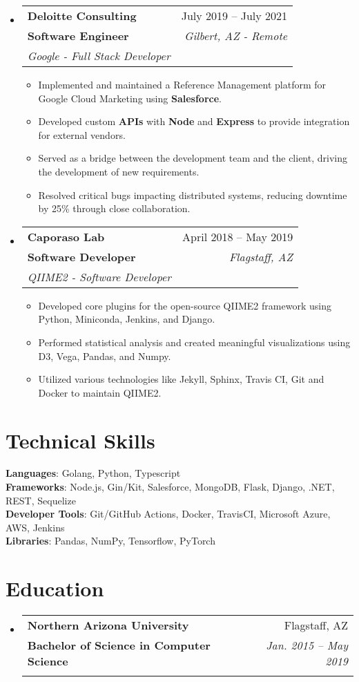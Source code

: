 \documentclass[letterpaper,11pt]{article}
\makeatletter
\newcommand{\resumeItem}[1]{
  \item\small{
    {#1 \vspace{-2pt}}
  }
}
\newcommand{\resumeSubheading}[5]{
  \vspace{-2pt}\item
    \begin{tabular*}{0.97\textwidth}[t]{l@{\extracolsep{\fill}}r}
      \textbf{#1} & #2 \\
      \textbf{\small#3} & \textit{\small #4} \\
      \textit{\small#5} \\
    \end{tabular*}\vspace{-7pt}
}
\newcommand{\resumeSubHeadingListStart}{\begin{itemize}[leftmargin=0.15in, label={}]}
\newcommand{\resumeSubHeadingListEnd}{\end{itemize}}
\newcommand{\resumeItemListStart}{\begin{itemize}}
\newcommand{\resumeItemListEnd}{\end{itemize}\vspace{-5pt}}
\makeatother
\begin{document}
\resumeSubHeadingListStart
\resumeSubheading
{Deloitte Consulting}{July 2019 -- July 2021}
{Software Engineer}{Gilbert, AZ - Remote}
{Google - Full Stack Developer}
\resumeItemListStart
\resumeItem{Implemented and maintained a Reference Management platform for Google Cloud Marketing using \textbf{Salesforce}.}
\resumeItem{Developed custom \textbf{APIs} with \textbf{Node} and \textbf{Express} to provide integration for external vendors.}
\resumeItem{Served as a bridge between the development team and the client, driving the development of new requirements.}
\resumeItem{Resolved critical bugs impacting distributed systems, reducing downtime by 25\% through close collaboration.}
\resumeItemListEnd
\resumeSubHeadingListEnd



\resumeSubHeadingListStart
\resumeSubheading
{Caporaso Lab}{April 2018 -- May 2019}
{Software Developer}{Flagstaff, AZ}
{QIIME2 - Software Developer}
\resumeItemListStart
\resumeItem{Developed core plugins for the open-source QIIME2 framework using Python, Miniconda, Jenkins, and Django.}
\resumeItem{Performed statistical analysis and created meaningful visualizations using D3, Vega, Pandas, and Numpy.}
\resumeItem{Utilized various technologies like Jekyll, Sphinx, Travis CI, Git and Docker to maintain QIIME2.}
\resumeItemListEnd
\resumeSubHeadingListEnd


\section{Technical Skills}
\begin{itemize}[leftmargin=0.15in, label={}]
 \small{\item{
       \textbf{Languages}{: Golang, Python, Typescript} \\
       \textbf{Frameworks}{: Node.js, Gin/Kit, Salesforce, MongoDB, Flask, Django, .NET, REST, Sequelize} \\
       \textbf{Developer Tools}{: Git/GitHub Actions, Docker, TravisCI, Microsoft Azure, AWS, Jenkins} \\
       \textbf{Libraries}{: Pandas, NumPy, Tensorflow, PyTorch}
       }}
\end{itemize}

\section{Education}
\resumeSubHeadingListStart
\resumeSubheading
{Northern Arizona University}{Flagstaff, AZ}
{\normalfont Bachelor of Science in Computer Science}{Jan. 2015 -- May 2019}
{}
\resumeSubHeadingListEnd

\end{document}
